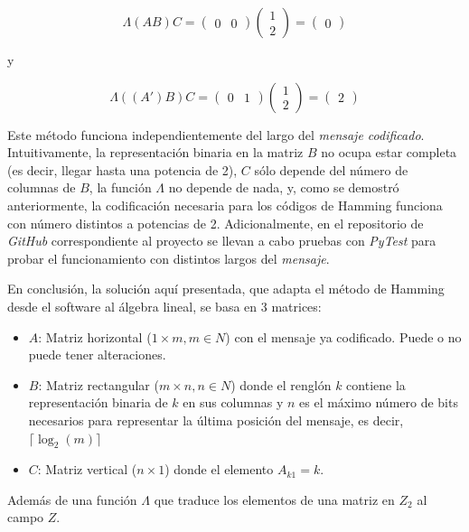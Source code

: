 \documentclass{article}
\begin{document}
$$
\Lambda(AB)C = \begin{pmatrix}
    0 & 0
\end{pmatrix}
\begin{pmatrix}
    1 \\ 2
\end{pmatrix}
= \begin{pmatrix}
    0
\end{pmatrix}
$$
\begin{center}
    y
\end{center}
$$
\Lambda((A')B)C = \begin{pmatrix}
    0 & 1
\end{pmatrix}
\begin{pmatrix}
    1 \\ 2
\end{pmatrix}
= \begin{pmatrix}
    2
\end{pmatrix}
$$

Este método funciona independientemente del largo del \textit{mensaje codificado}. Intuitivamente, la representación binaria en la matriz $B$ no ocupa estar completa (es decir, llegar hasta una potencia de 2), $C$ sólo depende del número de columnas de $B$, la función $\Lambda$ no depende de nada, y, como se demostró anteriormente, la codificación necesaria para los códigos de Hamming funciona con número distintos a potencias de 2. Adicionalmente, en el repositorio de \textit{GitHub} correspondiente al proyecto se llevan a cabo pruebas con \textit{PyTest} para probar el funcionamiento con distintos largos del \textit{mensaje}. 

En conclusión, la solución aquí presentada, que adapta el método de Hamming desde el software al álgebra lineal, se basa en 3 matrices:
\begin{itemize}
    \item $A$: Matriz horizontal ($1 \times m, m \in N$) con el mensaje ya codificado. Puede o no puede tener alteraciones.
    \item $B$: Matriz rectangular ($m \times n, n \in N$) donde el renglón $k$ contiene la representación binaria de $k$ en sus columnas y $n$ es el máximo número de bits necesarios para representar la última posición del mensaje, es decir, $\lceil \log_2 (m) \rceil$
    \item $C$: Matriz vertical ($n \times 1$) donde el elemento $A_{k1} = k$.
\end{itemize}
Además de una función $\Lambda$ que traduce los elementos de una matriz en $Z_2$ al campo $Z$.
\end{document}
